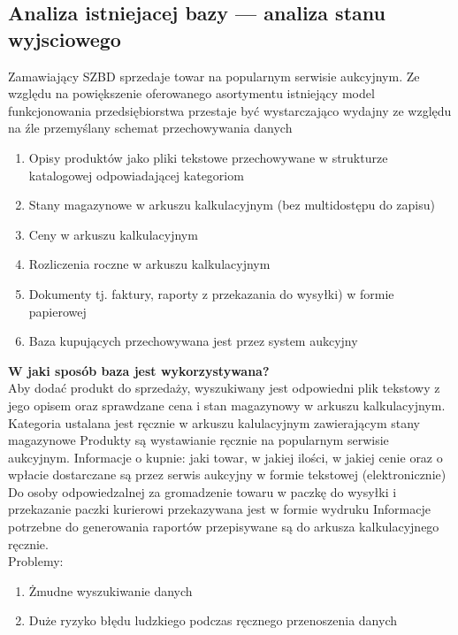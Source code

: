 \subsection{Analiza istniejacej bazy — analiza stanu wyjsciowego}
Zamawiający SZBD sprzedaje towar na popularnym serwisie aukcyjnym. 
Ze względu na powiększenie oferowanego asortymentu istniejący model funkcjonowania przedsiębiorstwa przestaje być wystarczająco wydajny 
ze względu na źle przemyślany schemat przechowywania danych
\begin{enumerate}
\item Opisy produktów jako pliki tekstowe przechowywane w strukturze katalogowej odpowiadającej kategoriom
\item Stany magazynowe w arkuszu kalkulacyjnym (bez multidostępu do zapisu)
\item Ceny w arkuszu kalkulacyjnym
\item Rozliczenia roczne w arkuszu kalkulacyjnym 
\item Dokumenty tj. faktury, raporty z przekazania do wysyłki) w formie papierowej
\item Baza kupujących przechowywana jest przez system aukcyjny	
\end{enumerate}
\textbf{W jaki sposób baza jest wykorzystywana?}\\
Aby dodać produkt do sprzedaży, wyszukiwany jest odpowiedni plik tekstowy z jego opisem oraz sprawdzane cena i stan magazynowy w arkuszu kalkulacyjnym.
Kategoria ustalana jest ręcznie w arkuszu kalulacyjnym zawierającym stany magazynowe
Produkty są wystawianie ręcznie na popularnym serwisie aukcyjnym.
Informacje o kupnie: jaki towar, w jakiej ilości, w jakiej cenie oraz o wpłacie dostarczane są przez serwis aukcyjny w formie tekstowej (elektronicznie)
Do osoby odpowiedzalnej za gromadzenie towaru w paczkę do wysyłki i przekazanie paczki kurierowi przekazywana jest w formie wydruku
Informacje potrzebne do generowania raportów przepisywane są do arkusza kalkulacyjnego ręcznie.\\
Problemy: 
\begin{enumerate}
	\item Żmudne wyszukiwanie danych
	\item Duże ryzyko błędu ludzkiego podczas ręcznego przenoszenia danych 
\end{enumerate}


